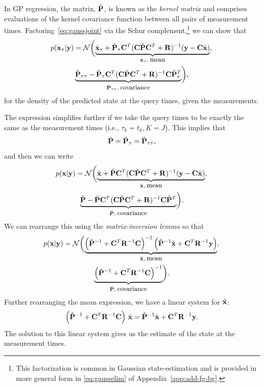 In \ac{GP} regression, the matrix, $\check{\mathbf{P}}$, is known as the  {\em kernel matrix} and comprises evaluations of the kernel covariance function between all pairs of measurement times.  Factoring~\eqref{eq:gaussjoint} via the Schur complement,\footnote{This factorization is common in Gaussian state-estimation and is provided in more general form in \eqref{eq:gausselim} of Appendix~\ref{app:add-fg-bg}.} we can show that
\begin{multline}
\label{eq:gpquerytimes}
p(\mathbf{x}_\tau | \mathbf{y}) = \mathcal{N}\biggl( \underbrace{\check{\mathbf{x}}_\tau + \check{\mathbf{P}}_{\tau} \mathbf{C}^T( \mathbf{C} \check{\mathbf{P}} \mathbf{C}^T + \mathbf{R})^{-1} (\mathbf{y} - \mathbf{C}\check{\mathbf{x}} )}_{\hat{\mathbf{x}}_{\tau}, \;\mbox{\small mean}}, \biggr. \\ \biggl. 
\underbrace{\check{\mathbf{P}}_{\tau\tau} - \check{\mathbf{P}}_\tau \mathbf{C}^T ( \mathbf{C} \check{\mathbf{P}} \mathbf{C}^T + \mathbf{R}  )^{-1} \mathbf{C} \check{\mathbf{P}}_\tau^T }_{\hat{\mathbf{P}}_{\tau\tau}, \;\mbox{\small covariance}}\biggr),
\end{multline}
for the density of the predicted state at the query times, given the measurements.  

The expression simplifies further if we take the query times to be exactly the same as the measurement times (i.e., $\tau_k = t_k, K=J$).  This implies that 
\begin{equation}
\check{\mathbf{P}} = \check{\mathbf{P}}_\tau = \check{\mathbf{P}}_{\tau\tau},
\end{equation}
and then we can write
\begin{multline}
\label{eq:gpmeastimes2}
p(\mathbf{x} | \mathbf{y}) = \mathcal{N}\biggl( \underbrace{\check{\mathbf{x}} + \check{\mathbf{P}} \mathbf{C}^T( \mathbf{C} \check{\mathbf{P}} \mathbf{C}^T + \mathbf{R})^{-1} (\mathbf{y} - \mathbf{C}\check{\mathbf{x}} )}_{\hat{\mathbf{x}}, \;\mbox{\small mean}}, \biggr. \\ \biggl.
\underbrace{\check{\mathbf{P}} - \check{\mathbf{P}} \mathbf{C}^T ( \mathbf{C} \check{\mathbf{P}} \mathbf{C}^T + \mathbf{R}  )^{-1} \mathbf{C} \check{\mathbf{P}}^T }_{\hat{\mathbf{P}}, \;\mbox{\small covariance}}\biggr).
\end{multline}
We can rearrange this using the {\em matrix-inversion lemma} so that
\begin{multline}
\label{eq:gpmeastimes}
p(\mathbf{x} | \mathbf{y}) = \mathcal{N}\biggl(  \underbrace{\left( \check{\mathbf{P}}^{-1} + \mathbf{C}^T \mathbf{R}^{-1} \mathbf{C} \right)^{-1} \left( \check{\mathbf{P}}^{-1} \check{\mathbf{x}}  + \mathbf{C}^T \mathbf{R}^{-1}\mathbf{y} \right)}_{\hat{\mathbf{x}}, \;\mbox{\small mean}}, \biggr. \\ \biggl.\underbrace{\left( \check{\mathbf{P}}^{-1} + \mathbf{C}^T \mathbf{R}^{-1} \mathbf{C} \right)^{-1} }_{\hat{\mathbf{P}}, \;\mbox{\small covariance}} \biggr).
\end{multline}
Further rearranging the mean expression, we have a linear system for $\hat{\mathbf{x}}$:
\begin{equation}
\label{eq:gpgnlin}
 \left( \check{\mathbf{P}}^{-1} + \mathbf{C}^T \mathbf{R}^{-1} \mathbf{C} \right) \, \hat{\mathbf{x}} =  \check{\mathbf{P}}^{-1} \check{\mathbf{x}} + \mathbf{C}^T \mathbf{R}^{-1}\mathbf{y}.
\end{equation}
The solution to this linear system gives us the estimate of the state at the measurement times.

